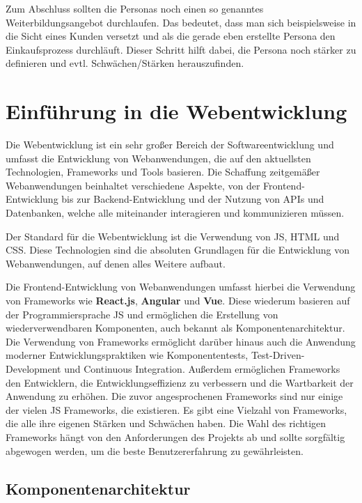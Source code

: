 Zum Abschluss sollten die Personas noch einen so genanntes Weiterbildungsangebot durchlaufen. Das bedeutet, dass man sich beispielsweise in die Sicht eines Kunden versetzt und als die gerade eben erstellte Persona den Einkaufsprozess durchläuft.\cite{personamethode} Dieser Schritt hilft dabei, die Persona noch stärker zu definieren und evtl. Schwächen/Stärken herauszufinden.

\section{Einführung in die Webentwicklung}

Die Webentwicklung ist ein sehr großer Bereich der Softwareentwicklung und umfasst die Entwicklung von Webanwendungen, die auf den aktuellsten Technologien, Frameworks und Tools basieren. Die Schaffung zeitgemäßer Webanwendungen beinhaltet verschiedene Aspekte, von der Frontend-Entwicklung bis zur Backend-Entwicklung und der Nutzung von \acf{API}s und Datenbanken, welche alle miteinander interagieren und kommunizieren müssen.

Der Standard für die Webentwicklung ist die Verwendung von \acf{JS}, \acf{HTML} und \acf{CSS}. Diese Technologien sind die absoluten Grundlagen für die Entwicklung von Webanwendungen, auf denen alles Weitere aufbaut.

Die Frontend-Entwicklung von Webanwendungen umfasst hierbei die Verwendung von Frameworks wie \textbf{React.js}, \textbf{Angular} und \textbf{Vue}. Diese wiederum basieren auf der Programmiersprache \acl{JS} und ermöglichen die Erstellung von wiederverwendbaren Komponenten, auch bekannt als Komponentenarchitektur. Die Verwendung von Frameworks ermöglicht darüber hinaus auch die Anwendung moderner Entwicklungspraktiken wie Komponententests, Test-Driven-Development und Continuous Integration. Außerdem ermöglichen Frameworks den Entwicklern, die Entwicklungseffizienz zu verbessern und die Wartbarkeit der Anwendung zu erhöhen. Die zuvor angesprochenen Frameworks sind nur einige der vielen \acl{JS} Frameworks, die existieren. Es gibt eine Vielzahl von Frameworks, die alle ihre eigenen Stärken und Schwächen haben. Die Wahl des richtigen Frameworks hängt von den Anforderungen des Projekts ab und sollte sorgfältig abgewogen werden, um die beste Benutzererfahrung zu gewährleisten.\cite{modern-webdevelopment:1, modern-webdevelopment:2}

\subsection{Komponentenarchitektur}

